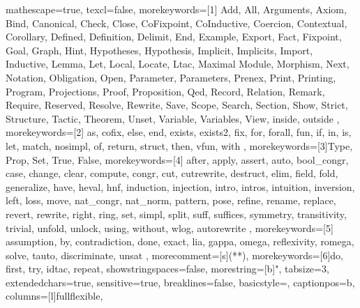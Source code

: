 
 {
mathescape=true,						
texcl=false,
morekeywords=[1]{
  Add,
  All,
  Arguments,
  Axiom,
  Bind,
  Canonical,
  Check,
  Close,
  CoFixpoint,
  CoInductive,
  Coercion,
  Contextual,
  Corollary,
  Defined,
  Definition,
  Delimit,
  End,
  Example,
  Export,
  Fact,
  Fixpoint,
  Goal,
  Graph,
  Hint,
  Hypotheses,
  Hypothesis,
  Implicit,
  Implicits,
  Import,
  Inductive,
  Lemma,
  Let,
  Local,
  Locate,
  Ltac,
  Maximal
  Module,
  Morphism,
  Next,
  Notation,
  Obligation,
  Open,
  Parameter,
  Parameters,
  Prenex,
  Print,
  Printing,
  Program,
  Projections,
  Proof,
  Proposition,
  Qed,
  Record,
  Relation,
  Remark,
  Require,
  Reserved,
  Resolve,
  Rewrite,
  Save,
  Scope,
  Search,
  Section,
  Show,
  Strict,
  Structure,
  Tactic,
  Theorem,
  Unset,
  Variable,
  Variables,
  View,
  inside,
  outside
},
morekeywords=[2]{
  as,
  cofix,
  else,
  end,
  exists,
  exists2,
  fix,
  for,
  forall,
  fun,
  if,
  in,
  is,
  let,
  match,
  nosimpl,
  of,
  return,
  struct,
  then,
  vfun,
  with
},
morekeywords=[3]{Type, Prop, Set, True, False},
morekeywords=[4]{
  after,
  apply,
  assert,
  auto,
  bool_congr,
  case,
  change,
  clear,
  compute,
  congr,
  cut,
  cutrewrite,
  destruct,
  elim,
  field,
  fold,
  generalize,
  have,
  heval, 
  hnf,
  induction,
  injection,
  intro,
  intros,
  intuition,
  inversion,
  left,
  loss,
  move,
  nat_congr,
  nat_norm,
  pattern,
  pose,
  refine,
  rename,
  replace,
  revert,
  rewrite,
  right,
  ring,
  set,
  simpl,
  split,
  suff,
  suffices,
  symmetry,
  transitivity,
  trivial,
  unfold,
  unlock,
  using,
  without,
  wlog,
  autorewrite
},        
morekeywords=[5]{
  assumption,
  by,
  contradiction,
  done,
  exact,
  lia,
  gappa,
  omega,
  reflexivity,
  romega,
  solve,
  tauto,
  discriminate,
  unsat
},
morecomment=[s]{(*}{*)},
morekeywords=[6]{do, first, try, idtac, repeat},
showstringspaces=false,
morestring=[b]",
tabsize=3,							
extendedchars=true,  		 		
sensitive=true, 
breaklines=false,
basicstyle=\footnotesize\ttfamily,
captionpos=b,							
columns=[l]fullflexible,
}
